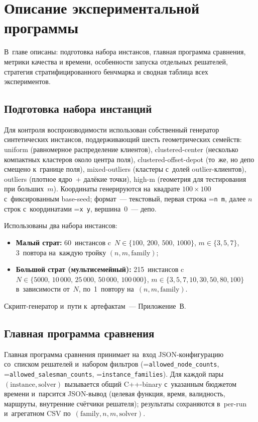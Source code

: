 \documentclass[a4paper,14pt]{extreport}
\makeatletter
\let\old@texttt\texttt
\renewcommand{\texttt}[1]{{\sloppy\hyphenchar\font=\m@ne\old@texttt{#1}}}
\makeatother
\begin{document}
\chapter{Описание экспериментальной программы}

В~главе описаны: подготовка набора инстансов, главная программа сравнения, метрики качества и времени, особенности запуска отдельных решателей, стратегия стратифицированного бенчмарка и сводная таблица всех экспериментов.

\section{Подготовка набора инстанций}

Для контроля воспроизводимости использован собственный генератор синтетических инстансов, поддерживающий шесть геометрических семейств: uniform (равномерное распределение клиентов), clustered-center (несколько компактных кластеров около центра поля), clustered-offset-depot (то~же, но депо смещено к~границе поля), mixed-outliers (кластеры с~долей outlier-клиентов), outliers (плотное ядро~+ далёкие точки), high-m (геометрия для тестирования при больших~$m$). Координаты генерируются на~квадрате $100\times 100$ с~фиксированным base-seed; формат~--- текстовый, первая строка \texttt{n m}, далее $n$ строк с~координатами \texttt{x y}, вершина~0~--- депо.

Использованы два набора инстансов:
\begin{itemize}\itemsep1pt
\item \textbf{Малый страт:} 60~инстансов c~$N\in\{100,\,200,\,500,\,1000\}$, $m\in\{3,5,7\}$, 3~повтора на~каждую тройку $(n,m,\text{family})$;
\item \textbf{Большой страт (мультисемейный):} 215~инстансов c~$N\in\{5000,\,10\,000,\,25\,000,\,50\,000,\,100\,000\}$, $m\in\{3,5,7,10,30,50,80,100\}$ в~зависимости от~$N$, по~1~повтору на~$(n,m,\text{family})$.
\end{itemize}

Скрипт-генератор и~пути к~артефактам~--- Приложение~В.

\section{Главная программа сравнения}

Главная программа сравнения принимает на~вход JSON-конфигурацию со~списком решателей и~набором фильтров (\texttt{allowed\_node\_counts}, \texttt{allowed\_salesman\_counts}, \texttt{instance\_families}). Для каждой пары $(\text{instance},\text{solver})$ вызывается общий C++-binary с~указанным бюджетом времени и~парсится JSON-вывод (целевая функция, время, валидность, маршруты, внутренние счётчики решателя); результаты сохраняются в~per-run и~агрегатном CSV по~$(\text{family},n,m,\text{solver})$.
\end{document}
